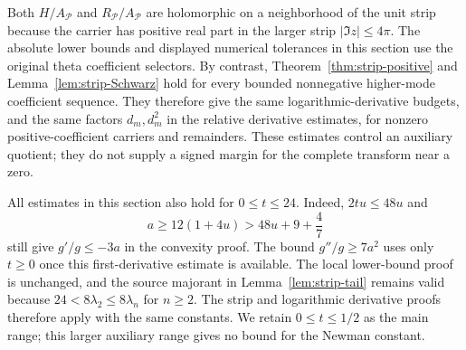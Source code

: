 Both $H/A_{\mathcal P}$ and $R_{\mathcal P}/A_{\mathcal P}$ are
holomorphic on a neighborhood of the unit strip because the carrier has
positive real part in the larger strip $|\Im z|\le4\pi$. The absolute
lower bounds and displayed numerical tolerances in this section use the
original theta coefficient selectors. By contrast,
Theorem~\ref{thm:strip-positive} and Lemma~\ref{lem:strip-Schwarz}
hold for every bounded nonnegative higher-mode coefficient sequence.
They therefore give the same logarithmic-derivative budgets, and the
same factors $d_m,d_m^2$ in the relative derivative estimates, for
nonzero positive-coefficient carriers and remainders. These estimates
control an auxiliary quotient; they do not supply a signed margin for
the complete transform near a zero.

\begin{remark}\label{rem:time24}
All estimates in this section also hold for $0\le t\le24$. Indeed,
$2tu\le48u$ and
\[
 a\ge12(1+4u)>48u+9+\frac47
\]
still give $g'/g\le-3a$ in the convexity proof. The bound
$g''/g\ge7a^2$ uses only $t\ge0$ once this first-derivative estimate
is available. The local lower-bound proof is unchanged, and the source
majorant in Lemma~\ref{lem:strip-tail} remains valid because
$24<8\lambda_2\le8\lambda_n$ for $n\ge2$. The strip and logarithmic
derivative proofs therefore apply with the same constants. We retain
$0\le t\le1/2$ as the main range; this larger auxiliary range gives
no bound for the Newman constant.
\end{remark}

